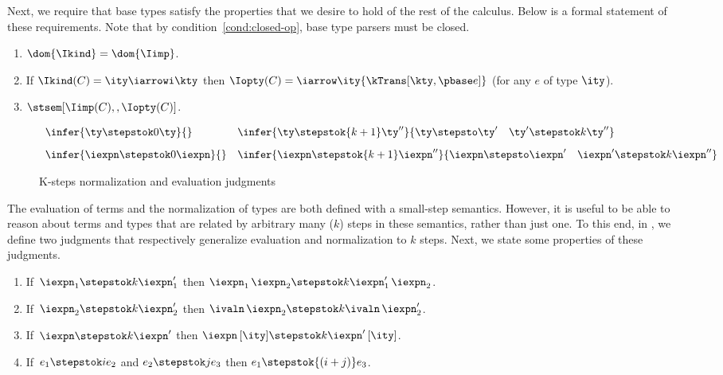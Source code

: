Next, we require that \ddc{} base types satisfy the properties that we
desire to hold of the rest of the calculus.  Below is a formal
statement of these requirements. Note that by
condition~\ref{cond:closed-op}, base type parsers must be closed.
\begin{condition}
\label{cond:base-types}
  \begin{enumerate}
  \item $\dom {\Ikind} = \dom {\Iimp}$.
  \item If $\Ikind(C) = {\ity \iarrowi \kty}$ then $\Iopty(C) =
    \iarrow \ity {\kTrans[\kty,\pbase e]}$ (for any $e$ of type $\ity$).
  \item $\stsem[\Iimp(C),,\Iopty(C)]$.
    \label{cond:closed-op}
  \end{enumerate}
\end{condition}

\begin{figure}[t]
\[ 
\begin{array}{ll}
  \infer{\ty \stepstok 0 \ty}{} \qquad
  &
  \infer{\ty \stepstok {k+1} \ty''}
  {\ty \stepsto \ty' \quad \ty' \stepstok k \ty''}
\\[2ex]
  \infer{\iexpn \stepstok 0 \iexpn}{} 
&
 \infer{\iexpn \stepstok {k+1} \iexpn''}
  {\iexpn \stepsto \iexpn' \quad \iexpn' \stepstok k \iexpn''}
\end{array}
\]
\caption{K-steps normalization and evaluation judgments}
\label{fig:k-steps-norm-eval}
\end{figure}

The evaluation of \fomega{} terms and the normalization of \ddc{}
types are both defined with a small-step semantics. However, it is
useful to be able to reason about terms and types that are related by
arbitrary many ($k$) steps in these semantics, rather than just one.
To this end, in , we define two
judgments that respectively generalize evaluation and normalization to
$k$ steps. Next, we state some properties of these judgments.

\begin{lemma}
  \begin{enumerate}
  \item If $\,\iexpn_1 \stepstok k \iexpn_1'$ then $\iexpn_1 \, \iexpn_2
    \stepstok k \iexpn_1' \, \iexpn_2$.
  \item If $\,\iexpn_2 \stepstok k \iexpn_2'$ then $\ivaln \, \iexpn_2
    \stepstok k \ivaln \, \iexpn_2'$.
  \item If $\,\iexpn \stepstok k \iexpn'$ then $\iexpn \, [\ity]
    \stepstok k \iexpn' \, [\ity]$.
  \item If $\, e_1 \stepstok i e_2$ and $e_2 \stepstok j e_3$
    then $e_1 \stepstok {(i+j)} e_3$.
  \end{enumerate}
\label{lemma:kleene-eval}
\end{lemma}

